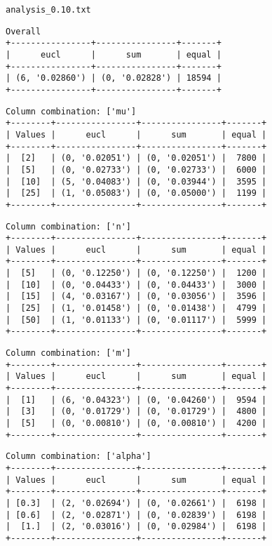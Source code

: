 \documentclass{article}
\begin{document}
\begin{verbatim}

\end{verbatim}

\newpage
\verb|analysis_0.10.txt|
\begin{verbatim}
Overall
+----------------+----------------+-------+
|      eucl      |      sum       | equal |
+----------------+----------------+-------+
| (6, '0.02860') | (0, '0.02828') | 18594 |
+----------------+----------------+-------+
\end{verbatim}

\begin{verbatim}
Column combination: ['mu']
+--------+----------------+----------------+-------+
| Values |      eucl      |      sum       | equal |
+--------+----------------+----------------+-------+
|  [2]   | (0, '0.02051') | (0, '0.02051') |  7800 |
|  [5]   | (0, '0.02733') | (0, '0.02733') |  6000 |
|  [10]  | (5, '0.04083') | (0, '0.03944') |  3595 |
|  [25]  | (1, '0.05083') | (0, '0.05000') |  1199 |
+--------+----------------+----------------+-------+
\end{verbatim}

\begin{verbatim}
Column combination: ['n']
+--------+----------------+----------------+-------+
| Values |      eucl      |      sum       | equal |
+--------+----------------+----------------+-------+
|  [5]   | (0, '0.12250') | (0, '0.12250') |  1200 |
|  [10]  | (0, '0.04433') | (0, '0.04433') |  3000 |
|  [15]  | (4, '0.03167') | (0, '0.03056') |  3596 |
|  [25]  | (1, '0.01458') | (0, '0.01438') |  4799 |
|  [50]  | (1, '0.01133') | (0, '0.01117') |  5999 |
+--------+----------------+----------------+-------+
\end{verbatim}

\begin{verbatim}
Column combination: ['m']
+--------+----------------+----------------+-------+
| Values |      eucl      |      sum       | equal |
+--------+----------------+----------------+-------+
|  [1]   | (6, '0.04323') | (0, '0.04260') |  9594 |
|  [3]   | (0, '0.01729') | (0, '0.01729') |  4800 |
|  [5]   | (0, '0.00810') | (0, '0.00810') |  4200 |
+--------+----------------+----------------+-------+
\end{verbatim}

\begin{verbatim}
Column combination: ['alpha']
+--------+----------------+----------------+-------+
| Values |      eucl      |      sum       | equal |
+--------+----------------+----------------+-------+
| [0.3]  | (2, '0.02694') | (0, '0.02661') |  6198 |
| [0.6]  | (2, '0.02871') | (0, '0.02839') |  6198 |
|  [1.]  | (2, '0.03016') | (0, '0.02984') |  6198 |
+--------+----------------+----------------+-------+
\end{verbatim}
\end{document}
